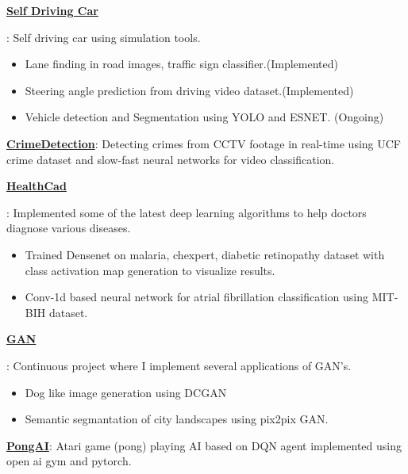 \documentclass[letterpaper,10pt]{article}
\newcommand{\resumeItem}[2]{
  \item\small{
    \textbf{#1}{: #2 \vspace{-2pt}}
  }
}
\newcommand{\resumeSubItem}[2]{\resumeItem{#1}{#2}\vspace{-4pt}}
\begin{document}
    \resumeSubItem{\color{blue}\href{https://github.com/sanchit2843/SelfDrivingCar}{Self Driving Car}}
      {
      Self driving car using simulation tools.
        \vspace{-5pt}
        \begin{itemize}
            \item Lane finding in road images, traffic sign classifier.(Implemented)
            \item Steering angle prediction from driving video dataset.(Implemented)
            \item Vehicle detection and Segmentation using YOLO and ESNET. (Ongoing)
        \end{itemize}
      }
      
    \resumeSubItem{\color{blue}\href{https://github.com/sanchit2843/Videoclassification}{CrimeDetection}}
      {Detecting crimes from CCTV footage in real-time using UCF crime dataset and slow-fast neural networks for video classification.}
      
      
    \resumeSubItem{\color{blue}\href{https://github.com/sanchit2843/healthcad}{HealthCad}}
      {Implemented some of the latest deep learning algorithms to help doctors diagnose various diseases.
        \vspace{-5pt}
        \begin{itemize}
            \item Trained Densenet on malaria, chexpert, diabetic retinopathy dataset with class activation map generation to visualize results. 
            \item Conv-1d based neural network for atrial fibrillation classification using MIT-BIH dataset. 
        \end{itemize}
      }
      
      \resumeSubItem{\color{blue}\href{https://github.com/sanchit2843/GAN-applications}{GAN}}
      {Continuous project where I implement several applications of GAN's.
        \vspace{-5pt}
        \begin{itemize}
            \item Dog like image generation using DCGAN
            \item Semantic segmantation of city landscapes using pix2pix GAN.
        \end{itemize}
      }
      
      \resumeSubItem{\color{blue}\href{https://github.com/sanchit2843/Reinforcementlearningprojects}{PongAI}}
      { Atari game (pong) playing AI based on DQN agent implemented using open ai gym and pytorch.
      }
      
\end{document}
